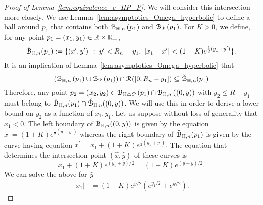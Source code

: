 \begin{proof}[Proof of Lemma~\ref{lem:equivalence_c_HP_P}]
We will consider this intersection more closely. We use Lemma~\ref{lem:asymptotics_Omega_hyperbolic} to define a ball around $p_1$ that contains both 
${\mathcal B}_{\mathbb{H},n}\left(p_1\right)$ and ${\mathcal B}_{{\mathcal P}}\left(p_1\right)$.
For $K > 0$, we define, for any point $p_1=(x_1,y_1) \in {\ensuremath{\mathbb R}} \times {\ensuremath{\mathbb R}}_+$,
\begin{equation}\label{eq:def_fatball}
	\check{{\mathcal B}}_{\mathbb{H},n}(p_1) : = \{ (x',y') \ : \  y' < R_n - y_1, \ | x_1 - x'| < (1+K) e^{\frac{1}{2} (y_1 + y')}  \}.
\end{equation}
It is an implication of Lemma~\ref{lem:asymptotics_Omega_hyperbolic}  that 
\begin{equation*} %
(\BallHyp{p_1} \cup \BallPo{p_1}) \cap \Rcal([0, R_n - y_1]) \subseteq \FatBallHyp{p_1}
\end{equation*}
Therefore, any point $p_2 = (x_2,y_2) \in {\mathcal B}_{\mathbb{H} \bigtriangleup {\mathcal P}}\left(p_1\right) \cap {\mathcal B}_{\mathbb{H},n}\left((0,y)\right)$ with 
$y_2 \leq R-y_1$ must belong to $\check{{\mathcal B}}_{\mathbb{H},n}(p_1) \cap \check{{\mathcal B}}_{\mathbb{H},n}((0,y))$.
We will use this in order to derive a lower bound on $y_2$ as a function of $x_1, y_1$. 
Let us suppose without loss of generality that $x_1 < 0$. 
The left boundary of $\check{{\mathcal B}}_{\mathbb{H},n}((0,y))$ is given by the equation 
$x^\prime = (1+K)e^{\frac{1}{2} (y + y^\prime)}$ whereas the right boundary of $\check{{\mathcal B}}_{\mathbb{H},n}(p_1)$ is given by the curve having equation $x^\prime = x_1 + (1+ K)e^{\frac{1}{2} (y_1 + y^\prime)}.$
The equation that determines the intersection point $(\hat{x},\hat{y})$ of these curves  is
\[
	x_1 + (1+K)e^{(y_1 + \hat{y})/2}= (1+K) e^{(y + \hat{y})/2}.
\]
We can solve the above for $\hat{y}$  
\begin{equation*} 
\begin{split}
|x_1| &=(1+K) e^{\hat{y}/2} \left( e^{y_1/2} + e^{y/2} \right).
\end{split}
\end{equation*}

\end{proof}
